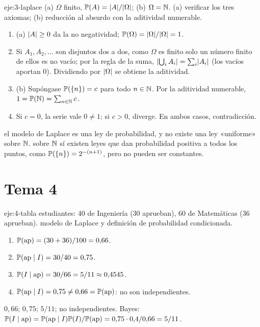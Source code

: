 \begin{solucion}{eje:3-laplace}
\datos (a) $\Omega$ finito, $\mathbb{P}(A)=\lvert A\rvert/\lvert\Omega\rvert$; (b) $\Omega=\mathbb{N}$.
\planteamiento (a) verificar los tres axiomas; (b) reducción al absurdo con la aditividad numerable.
\pasos
\begin{enumerate}[label=\arabic*.]
  \item (a) $\lvert A\rvert\ge0$ da la no negatividad; $\mathbb{P}(\Omega)=\lvert\Omega\rvert/\lvert\Omega\rvert=1$.
  \item Si $A_1,A_2,\dots$ son disjuntos dos a dos, como $\Omega$ es finito solo un número finito de ellos es no vacío; por la regla de la suma, $\lvert\bigcup_iA_i\rvert=\sum_i\lvert A_i\rvert$ (los vacíos aportan 0). Dividiendo por $\lvert\Omega\rvert$ se obtiene la aditividad.
  \item (b) Supóngase $\mathbb{P}(\{n\})=c$ para todo $n\in\mathbb{N}$. Por la aditividad numerable, $1=\mathbb{P}(\mathbb{N})=\sum_{n\in\mathbb{N}}c$.
  \item Si $c=0$, la serie vale $0\neq1$; si $c>0$, diverge. En ambos casos, contradicción.
\end{enumerate}
\resultado el modelo de Laplace es una ley de probabilidad, y no existe una ley «uniforme» sobre $\mathbb{N}$.
\comprobacion sobre $\mathbb{N}$ sí existen leyes que dan probabilidad positiva a todos los puntos, como $\mathbb{P}(\{n\})=2^{-(n+1)}$, pero no pueden ser constantes.
\end{solucion}

\section{Tema 4}

\begin{solucion}{eje:4-tabla}
 estudiantes: 40 de Ingeniería (30 aprueban), 60 de Matemáticas (36 aprueban).
\planteamiento modelo de Laplace y definición de probabilidad condicionada.
\pasos
\begin{enumerate}[label=\arabic*.]
  \item $\mathbb{P}(\text{ap})=(30+36)/100=0{,}66$.
  \item $\mathbb{P}(\text{ap}\mid I)=30/40=0{,}75$.
  \item $\mathbb{P}(I\mid\text{ap})=30/66=5/11\approx0{,}4545$.
  \item $\mathbb{P}(\text{ap}\mid I)=0{,}75\neq0{,}66=\mathbb{P}(\text{ap})$: no son independientes.
\end{enumerate}
\resultado $0{,}66$; $0{,}75$; $5/11$; no independientes.
\comprobacion Bayes: $\mathbb{P}(I\mid\text{ap})=\mathbb{P}(\text{ap}\mid I)\mathbb{P}(I)/\mathbb{P}(\text{ap})=0{,}75\cdot0{,}4/0{,}66=5/11$.
\end{solucion}

